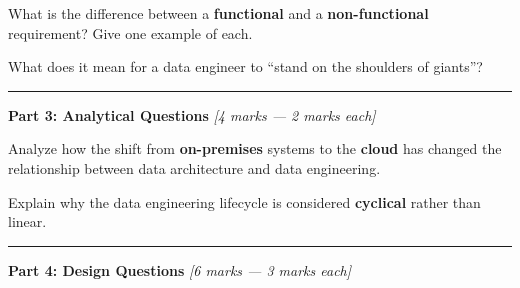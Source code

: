 \documentclass[12pt,addpoints]{exam}
\begin{document}
\vspace{2pt}
\begin{questions}
\setcounter{question}{0}


\question[1\half] What is the difference between a \textbf{functional} and a \textbf{non-functional} requirement? Give one example of each.
\fillwithdottedlines{7em}



\question[1] What does it mean for a data engineer to ``stand on the shoulders of giants''?
\fillwithdottedlines{5em}

\end{questions}

\rule[1ex]{\textwidth}{0.8pt}

\noindent\textbf{Part 3: Analytical Questions} \hfill \textit{[4 marks --- 2 marks each]}

\vspace{2pt}
\begin{questions}
\setcounter{question}{0}

\question[2] Analyze how the shift from \textbf{on-premises} systems to the \textbf{cloud} has changed the relationship between data architecture and data engineering.
\fillwithdottedlines{14em}

\question[2] Explain why the data engineering lifecycle is considered \textbf{cyclical} rather than linear.
\fillwithdottedlines{14em}

\end{questions}

\rule[1ex]{\textwidth}{0.8pt}

\noindent\textbf{Part 4: Design Questions} \hfill \textit{[6 marks --- 3 marks each]}
\end{document}
